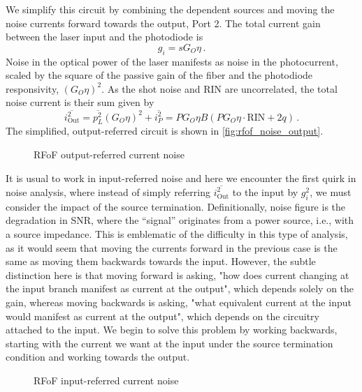 We simplify this circuit by combining the dependent sources and moving the noise currents forward towards the output, Port 2.
The total current gain between the laser input and the photodiode is
\begin{equation}
    g_i = sG_O\eta \,.
\end{equation}
Noise in the optical power of the laser manifests as noise in the photocurrent, scaled by the square of the passive gain of the fiber and the photodiode responsivity, $(G_O\eta)^2$.
As the shot noise and RIN are uncorrelated, the total noise current is their sum given by
\begin{equation}
    \overline{i_\text{Out}^2} = \overline{p_L^2}(G_O\eta)^2 + \overline{i_P^2} = PG_O\eta B(PG_O\eta\cdot\text{RIN} + 2q) \,.
\end{equation}
The simplified, output-referred circuit is shown in \autoref{fig:rfof_noise_output}.
\begin{figure}[ht!]
    \centering
    
    \caption{RFoF output-referred current noise}
    \label{fig:rfof_noise_output}
\end{figure}

It is usual to work in input-referred noise and here we encounter the first quirk in noise analysis, where instead of simply referring $\overline{i_\text{Out}^2}$ to the input by $g_i^2$, we must consider the impact of the source termination.
Definitionally, noise figure is the degradation in SNR, where the ``signal'' originates from a power source, i.e., with a source impedance.
This is emblematic of the difficulty in this type of analysis, as it would seem that moving the currents forward in the previous case is the same as moving them backwards towards the input.
However, the subtle distinction here is that moving forward is asking, "how does current changing at the input branch manifest as current at the output", which depends solely on the gain, whereas moving backwards is asking, "what equivalent current at the input would manifest as current at the output", which depends on the circuitry attached to the input.
We begin to solve this problem by working backwards, starting with the current we want at the input under the source termination condition and working towards the output.

\begin{figure}[ht!]
    \centering
    
    \caption{RFoF input-referred current noise}
    \label{fig:rfof_noise_input}
\end{figure}

